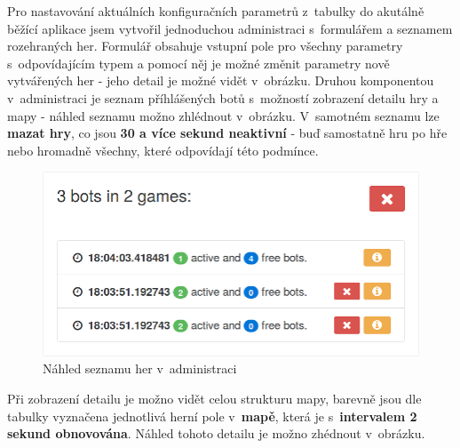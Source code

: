 Pro nastavování aktuálních konfiguračních parametrů z~tabulky do akutálně běžící aplikace jsem vytvořil jednoduchou administraci s~formulářem a seznamem rozehraných her. Formulář obsahuje vstupní pole pro všechny parametry s~odpovídajícím typem a pomocí něj je možné změnit parametry nově vytvářených her - jeho detail je možné vidět v~obrázku. Druhou komponentou v~administraci je seznam příhlášených botů s~možností zobrazení detailu hry a mapy - náhled seznamu možno zhlédnout v~obrázku. V~samotném seznamu lze \textbf{mazat hry}, co jsou \textbf{30 a více sekund neaktivní} - buď samostatně hru po hře nebo hromadně všechny, které odpovídají této podmínce.

\begin{figure}[h]
	\centering
	\includegraphics{assets/admin-games-list}
	\caption{Náhled seznamu her v~administraci}
	\label{fig:admin-games-list}
\end{figure}

Při zobrazení detailu je možno vidět celou strukturu mapy, barevně jsou dle tabulky vyznačena jednotlivá herní pole v~\textbf{mapě}, která je s~\textbf{intervalem 2 sekund obnovována}. Náhled tohoto detailu je možno zhédnout v~obrázku.


